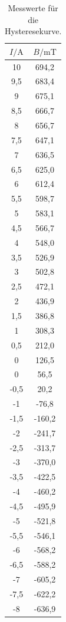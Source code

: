 \begin{table}
  \centering
  \caption{Messwerte für die Hysteresekurve.}
  \label{tab:7}
  \begin{tabular}{c c}
    \toprule
    $I/\si{\ampere}$ & $B/\si{\milli\tesla}$ \\
    \midrule
    10    & 694,2 \\
    9,5   & 683,4 \\
    9     & 675,1 \\
    8,5   & 666,7 \\
    8     & 656,7 \\
    7,5   & 647,1 \\
    7     & 636,5 \\
    6,5   & 625,0 \\
    6     & 612,4 \\
    5,5   & 598,7 \\
    5     & 583,1 \\
    4,5   & 566,7 \\
    4     & 548,0 \\
    3,5   & 526,9 \\
    3     & 502,8 \\
    2,5   & 472,1 \\
    2     & 436,9 \\
    1,5   & 386,8 \\
    1     & 308,3 \\
    0,5   & 212,0 \\
    0     & 126,5 \\
    0     &  56,5 \\
    -0,5  &  20,2 \\
    -1    & -76,8 \\
    -1,5  &-160,2 \\
    -2    &-241,7 \\
    -2,5  &-313,7 \\
    -3    &-370,0 \\
    -3,5  &-422,5 \\
    -4    &-460,2 \\
    -4,5  &-495,9 \\
    -5    &-521,8 \\
    -5,5  &-546,1 \\
    -6    &-568,2 \\
    -6,5  &-588,2 \\
    -7    &-605,2 \\
    -7,5  &-622,2 \\
    -8    &-636,9 \\

\end{tabular}
\end{table}
